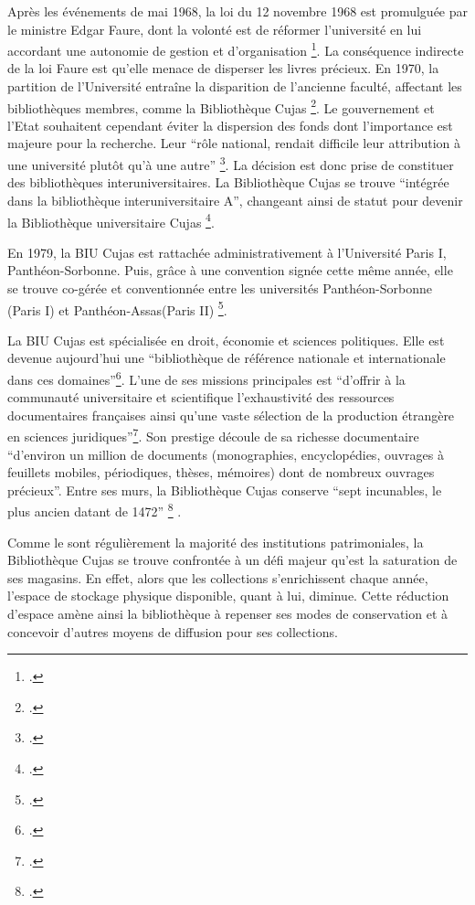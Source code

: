 Après les événements de mai 1968, la loi du 12 novembre 1968 est promulguée par le ministre Edgar Faure, dont la volonté est de réformer l'université en lui accordant une autonomie de gestion et d'organisation \footcite{LoiFaure}. La conséquence indirecte de la loi Faure est qu'elle menace de disperser les livres précieux.  En 1970, la partition de l'Université entraîne la disparition de l'ancienne faculté, affectant les bibliothèques membres, comme la Bibliothèque Cujas \footcite{BibliothequeInteruniversitaireCujas}. Le gouvernement et l'Etat souhaitent cependant éviter la dispersion des fonds dont l'importance est majeure pour la recherche. Leur \enquote{rôle national, rendait difficile leur attribution à une université plutôt qu'à une autre} \footcite{poulainHistoireBibliothequesFrancaises1992}. La décision est donc prise de constituer des bibliothèques interuniversitaires. La Bibliothèque Cujas se trouve \enquote{intégrée dans la bibliothèque interuniversitaire A}, changeant ainsi de statut pour devenir la Bibliothèque universitaire Cujas \footcite{poulainHistoireBibliothequesFrancaises1992}. 

En 1979, la \ac{BIU Cujas} est rattachée administrativement à l'Université Paris I, Panthéon-Sorbonne. Puis, grâce à une convention signée cette même année, elle se trouve co-gérée et conventionnée entre les universités Panthéon-Sorbonne (Paris I) et Panthéon-Assas(Paris II) \footcite{HistoireMissionsPartenariats}.
\bigskip

La \ac{BIU Cujas} est spécialisée en droit, économie et sciences politiques. Elle est devenue aujourd'hui une \enquote{bibliothèque de référence nationale et internationale dans ces domaines}\footcite{BibliothequeInteruniversitaireCujas}.
L'une de ses missions principales est \enquote{d'offrir à la communauté universitaire et scientifique l'exhaustivité des ressources documentaires françaises ainsi qu'une vaste sélection de la production étrangère en sciences juridiques}\footcite{BibliothequeInteruniversitaireCujas}. Son prestige découle de sa richesse documentaire \enquote{d'environ un million de documents (monographies, encyclopédies, ouvrages à feuillets mobiles, périodiques, thèses, mémoires) dont de nombreux ouvrages précieux}. Entre ses murs, la Bibliothèque Cujas conserve \enquote{sept incunables, le plus ancien datant de 1472} \footcite{BibliothequeInteruniversitaireCujas} .

Comme le sont régulièrement la majorité des institutions patrimoniales, la Bibliothèque Cujas se trouve confrontée à un défi majeur qu'est la saturation de ses magasins. En effet, alors que les collections s'enrichissent chaque année, l'espace de stockage physique disponible, quant à lui, diminue. Cette réduction d'espace amène ainsi la bibliothèque à repenser ses modes de conservation et à concevoir d'autres moyens de diffusion pour ses collections.